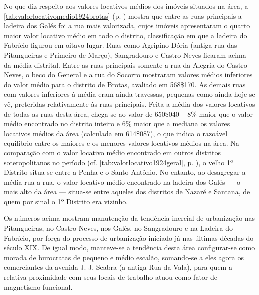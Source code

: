 
No que diz respeito aos valores locativos médios dos imóveis situados na área, a \autoref{tab:valorlocativomedio1924brotas} (p. \pageref{tab:valorlocativomedio1924brotas}) mostra que entre as ruas principais a ladeira dos Galés foi a rua mais valorizada, cujos imóveis apresentaram o quarto maior valor locativo médio em todo o distrito, classificação em que a ladeira do Fabrício figurou em oitavo lugar. Ruas como Agripino Dória (antiga rua das Pitangueiras e Primeiro de Março), Sangradouro e Castro Neves ficaram acima da média distrital. Entre as ruas principais somente a rua da Alegria do Castro Neves, o beco do General e a rua do Socorro mostraram valores médios inferiores do valor médio para o distrito de Brotas, avaliado em 568\$170. As demais ruas com valores inferiores à média eram ainda travessas, pequenas como ainda hoje se vê, preteridas relativamente às ruas principais. Feita a média dos valores locativos de todas as ruas desta área, chega-se ao valor de 650\$040 -- 8\% maior que o valor médio encontrado no distrito inteiro e 6\% maior que a mediana os valores locativos médios da área (calculada em 614\$087), o que indica o razoável equilíbrio entre os maiores e os menores valores locativos médios na área. Na comparação com o valor locativo médio encontrado em outros distritos soteropolitanos no período (cf. \autoref{tab:valorlocativo1924geral}, p. \pageref{tab:valorlocativo1924geral}), o velho 1º Distrito situa-se entre a Penha e o Santo Antônio. No entanto, ao desagregar a média rua a rua, o valor locativo médio encontrado na ladeira dos Galés --- o mais alto da área --- situa-se entre aqueles dos distritos de Nazaré e Santana, de quem por sinal o 1º Distrito era vizinho.


Os números acima mostram manutenção da tendência inercial de urbanização nas Pitangueiras, no Castro Neves, nos Galés, no Sangradouro e na Ladeira do Fabrício, por força do processo de urbanização iniciado já nas últimas décadas do século XIX. De igual modo, manteve-se a tendência desta área configurar-se como morada de burocratas de pequeno e médio escalão, somando-se a eles agora os comerciantes da avenida J. J. Seabra (a antiga Rua da Vala), para quem a relativa proximidade com seus locais de trabalho atuou como fator de magnetismo funcional.


